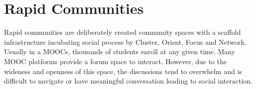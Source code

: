 \documentclass[manuscript,screen,review]{acmart}
\begin{document}
%






\section{Rapid Communities}
Rapid communities are deliberately created community spaces with a scaffold infrastructure incubating social process by Cluster, Orient, Focus and Network. Usually in a MOOCs, thousands of students enroll at any given time. Many MOOC platforms provide a forum space to interact. However, due to the wideness and openness of this space, the discussions tend to overwhelm and is difficult to navigate or have meaningful conversation leading to social interaction.
\end{document}
